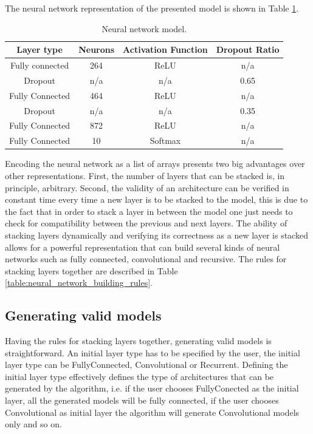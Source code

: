\documentclass[journal]{IEEEtran}
\begin{document}
The neural network representation of the presented model is shown in Table \ref{table:neural_network_model}. \\

\begin{table}[!htb]
\begin{center}
\begin{tabular}{| c | c | c | c |}
\hline
Layer type & Neurons & Activation Function & Dropout Ratio \\
\hline
Fully connected & 264 & ReLU & n/a \\
Dropout & n/a & n/a & 0.65 \\
Fully Connected & 464 & ReLU & n/a\\
Dropout & n/a & n/a & 0.35\\
Fully Connected & 872 & ReLU & n/a\\
Fully Connected & 10 & Softmax & n/a\\
\hline
\end{tabular}
\end{center}
\caption{Neural network model.}
\label{table:neural_network_model}
\end{table}

Encoding the neural network as a list of arrays presents two big advantages over other representations. First, the number of layers that can be stacked is, in principle, arbitrary. Second, the validity of an architecture can be verified in constant time every time a new layer is to be stacked to the model, this is due to the fact that in order to stack a layer in between the model one just needs to check for compatibility between the previous and next layers. The ability of stacking layers dynamically and verifying its correctness as a new layer is stacked allows for a powerful representation that can build several kinds of neural networks such as fully connected, convolutional and recursive. The rules for stacking layers together are described in Table \ref{table:neural_network_building_rules}.

\subsection{Generating valid models}
\label{sec:valid_models}

Having the rules for stacking layers together, generating valid models is straightforward. An initial layer type has to be specified by the user, the initial layer type can be FullyConnected, Convolutional or Recurrent. Defining the initial layer type effectively defines the type of architectures that can be generated by the algorithm, i.e. if the user chooses FullyConected as the initial layer, all the generated models will be fully connected, if the user chooses Convolutional as initial layer the algorithm will generate Convolutional models only and so on.
\end{document}
